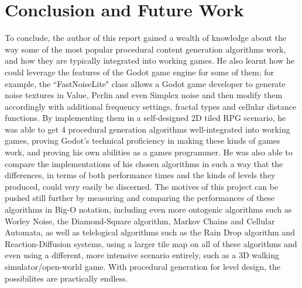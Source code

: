 \chapter{Conclusion and Future Work} \label{Conclusion}


To conclude, the author of this report gained a wealth of knowledge about the way some of the most popular procedural content generation algorithms work, and how they are typically integrated into working games. He also learnt how he could leverage the features of the Godot game engine for some of them; for example, the ``FastNoiseLite" class allows a Godot game developer to generate noise textures in Value, Perlin and even Simplex noise and then modify them accordingly with additional frequency settings, fractal types and cellular distance functions. By implementing them in a self-designed 2D tiled RPG scenario, he was able to get 4 procedural generation algorithms well-integrated into working games, proving Godot's technical proficiency in making these kinds of games work, and proving his own abilities as a games programmer. He was also able to compare the implementations of his chosen algorithms in such a way that the differences, in terms of both performance times and the kinds of levels they produced, could very easily be discerned. The motives of this project can be pushed still further by measuring and comparing the performances of these algorithms in Big-O notation, including even more ontogenic algorithms such as Worley Noise, the Diamond-Square algorithm, Markov Chains and Cellular Automata, as well as telelogical algorithms such as the Rain Drop algorithm and Reaction-Diffusion systems, using a larger tile map on all of these algorithms and even using a different, more intensive scenario entirely, such as a 3D walking simulator/open-world game. With procedural generation for level design, the possibilites are practically endless.